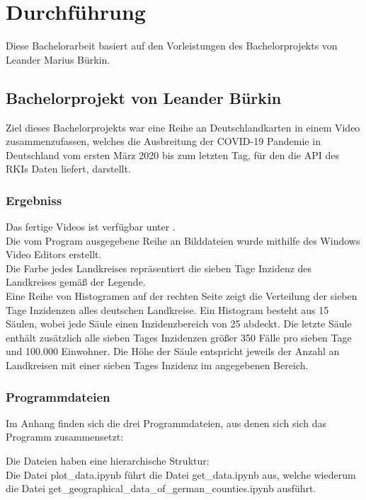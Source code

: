 \chapter{Durchführung}\label{chap:Durchführung}
Diese Bachelorarbeit basiert auf den Vorleistungen des Bachelorprojekts von Leander Marius Bürkin.

\section{Bachelorprojekt von Leander Bürkin}
Ziel dieses Bachelorprojekts war eine Reihe an Deutschlandkarten in einem Video zusammenzufassen, welches die Ausbreitung der COVID-19 Pandemie in Deutschland vom ersten März 2020 bis zum letzten Tag, für den die API des RKIs Daten liefert, darstellt.

\subsection{Ergebniss}
Das fertige Videos ist verfügbar unter .\\
Die vom Program ausgegebene Reihe an Bilddateien wurde mithilfe des Windows Video Editors erstellt.
\\
Die Farbe jedes Landkreises repräsentiert die sieben Tage Inzidenz des Landkreises gemäß der Legende.\\
Eine Reihe von Histogramen auf der rechten Seite zeigt die Verteilung der sieben Tage Inzidenzen alles deutschen Landkreise. Ein Histogram besteht aus 15 Säulen, wobei jede Säule einen Inzidenzbereich von 25 abdeckt. Die letzte Säule enthält zusätzlich alle sieben Tages Inzidenzen größer 350 Fälle pro sieben Tage und 100.000 Einwohner. Die Höhe der Säule entspricht jeweils der Anzahl an Landkreisen mit einer sieben Tages Inzidenz im angegebenen Bereich.

\subsection{Programmdateien}
Im Anhang finden sich die drei Programmdateien, aus denen sich sich das Programm zusammensetzt: 

Die Dateien haben eine hierarchische Struktur:\\
Die Datei \glqq{}plot\_data.ipynb\grqq{} führt die Datei \glqq{}get\_data.ipynb\grqq{} aus,
welche wiederum die Datei \glqq{}get\_geographical\_data\_of\_german\_counties.ipynb\grqq{} ausführt.

